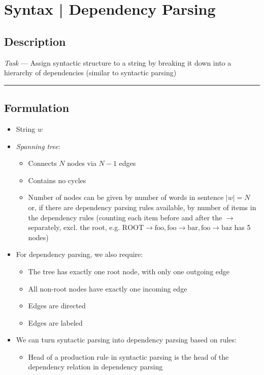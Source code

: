 \section{Syntax | Dependency Parsing}
\subsection*{Description}
\emph{Task} --- 
Assign syntactic structure to a string by breaking it down into a hierarchy of dependencies (similar to syntactic parsing)

{\color{black}\hrule height 0.001mm}

\subsection*{Formulation}
\begin{itemize}
    \item String $w$
    \item \emph{Spanning tree}: 
    \begin{itemize}
        \item Connects $N$ nodes via $N-1$ edges
        \item Contains no cycles
        \item Number of nodes can be given by number of words in sentence $|w| = N$ or, if there are dependency parsing rules available, by number of items in the dependency rules (counting each item before and after the $\to$ separately, excl. the root, e.g. $\textrm{ROOT}\to\textrm{foo}, \textrm{foo}\to\textrm{bar},\textrm{foo}\to\textrm{baz}$ has 5 nodes)
    \end{itemize}
    \item For dependency parsing, we also require:
    \begin{itemize}
        \item The tree has exactly one root node, with only one outgoing edge
        \item All non-root nodes have exactly one incoming edge
        \item Edges are directed
        \item Edges are labeled
    \end{itemize}
    \item We can turn syntactic parsing into dependency parsing based on rules:
    \begin{itemize}
        \item Head of a production rule in syntactic parsing is the head of the dependency relation in dependency parsing

\end{itemize}
\end{itemize}
